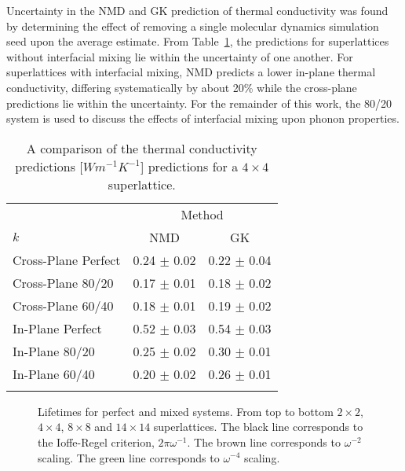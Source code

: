\documentclass[aps,prb,preprint,preprintnumbers,amsmath,amssymb,floatfix,superscriptaddress]{revtex4}
\begin{document}
Uncertainty in the NMD and GK prediction of thermal conductivity was found by determining the effect of removing a single molecular dynamics simulation seed upon the average estimate. From Table~\ref{TB:validate}, the predictions for superlattices without interfacial mixing lie within the uncertainty of one another. For superlattices with interfacial mixing, NMD predicts a lower in-plane thermal conductivity, differing systematically by about 20\% while the cross-plane predictions lie within the uncertainty. For the remainder of this work, the 80/20 system is used to discuss the effects of interfacial mixing upon phonon properties.
\begin{table}
\begin{center}
\begin{tabular}{lcc}
\hline\noalign{\smallskip}
&\multicolumn{2}{c}{Method} \\
\cline{2-3}\noalign{\smallskip}
$k$ & NMD  & GK  \\
\noalign{\smallskip}\hline\noalign{\smallskip}
Cross-Plane Perfect  & 0.24 $\pm$ 0.02 & 0.22 $\pm$ 0.04\\
Cross-Plane 80/20    & 0.17  $\pm$ 0.01   &   0.18 $\pm$ 0.02 \\
Cross-Plane 60/40    & 0.18  $\pm$ 0.01   &   0.19 $\pm$ 0.02 \\
In-Plane Perfect   & 0.52 $\pm$ 0.03 & 0.54 $\pm$ 0.03  \\
In-Plane 80/20  & 0.25 $\pm$ 0.02 & 0.30 $\pm$ 0.01  \\
In-Plane 60/40   & 0.20 $\pm$ 0.02 & 0.26 $\pm$ 0.01  \\
\noalign{\smallskip}\hline
\end{tabular}
\end{center}
\renewcommand{\table}{Table.}
\caption{A comparison of the thermal conductivity predictions [$Wm^{-1}K^{-1}$] predictions for a $4\times4$ superlattice.}
\label{TB:validate}
\end{table}
\renewcommand{\textfraction}{0.0}
\begin{figure}%
\begin{center}
\renewcommand{\figure}{Fig.}
\caption{Lifetimes for perfect and mixed systems. From top to bottom $2\times2$, $4\times4$, $8\times8$ and $14\times14$ superlattices. The black line corresponds to the Ioffe-Regel criterion, $2\pi\omega^{-1}$. The brown line corresponds to $\omega^{-2}$ scaling. The green line corresponds to $\omega^{-4}$ scaling.}
\label{FIG:lifetime}
\end{center}
\end{figure}
\end{document}
